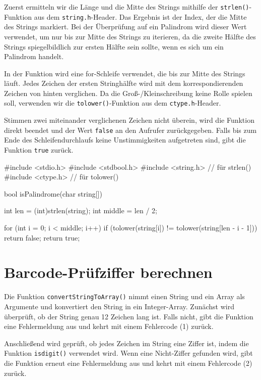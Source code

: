 Zuerst ermitteln wir die Länge und die Mitte des Strings mithilfe der
\texttt{strlen()}-Funktion aus dem \texttt{string.h}-Header. Das
Ergebnis ist der Index, der die Mitte des Strings markiert. Bei der Überprüfung
auf ein Palindrom wird dieser Wert verwendet, um nur bis zur Mitte des Strings
zu iterieren, da die zweite Hälfte des Strings spiegelbildlich zur ersten Hälfte
sein sollte, wenn es sich um ein Palindrom handelt.

In der Funktion wird eine for-Schleife verwendet, die bis zur Mitte des Strings
läuft. Jedes Zeichen der ersten Stringhälfte wird mit dem korrespondierenden
Zeichen von hinten verglichen. Da die Groß-/Kleinschreibung keine Rolle spielen
soll, verwenden wir die \texttt{tolower()}-Funktion aus dem
\texttt{ctype.h}-Header.

Stimmen zwei miteinander verglichenen Zeichen nicht überein, wird die Funktion
direkt beendet und der Wert \texttt{false} an den Aufrufer zurückgegeben.
Falls bis zum Ende des Schleifendurchlaufs keine Unstimmigkeiten aufgetreten
sind, gibt die Funktion \texttt{true} zurück.

\begin{codebox}[lang=c, fontsize=\small]
#include <stdio.h>
#include <stdbool.h>
#include <string.h> // für strlen()
#include <ctype.h>  // für tolower()

bool isPalindrome(char string[]) {
    int len = (int)strlen(string);
    int middle = len / 2;

    for (int i = 0; i < middle; i++) {
        if (tolower(string[i]) != tolower(string[len - i - 1]))
            return false;
    }
    return true;
}
\end{codebox}




\chapter{Barcode-Prüfziffer berechnen}

Die Funktion \texttt{convertStringToArray()} nimmt einen String und ein
Array als Argumente und konvertiert den String in ein Integer-Array. Zunächst
wird überprüft, ob der String genau 12 Zeichen lang ist. Falls nicht, gibt die
Funktion eine Fehlermeldung aus und kehrt mit einem Fehlercode (1) zurück.

Anschließend wird geprüft, ob jedes Zeichen im String eine Ziffer ist, indem die
Funktion \texttt{isdigit()} verwendet wird. Wenn eine Nicht-Ziffer
gefunden wird, gibt die Funktion erneut eine Fehlermeldung aus und kehrt mit
einem Fehlercode (2) zurück.

